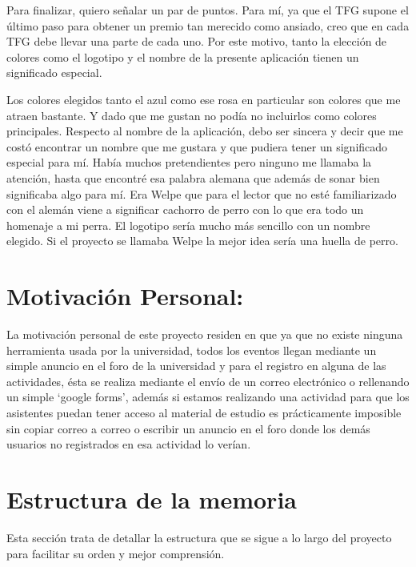Para finalizar, quiero señalar un par de puntos. Para mí, ya que el TFG supone el último paso para obtener un premio tan merecido como ansiado, creo que en cada TFG debe llevar una parte de cada uno. Por este motivo, tanto la elección de colores como el logotipo y el nombre de la presente aplicación tienen un significado especial. 


Los colores elegidos tanto el azul como ese rosa en particular son colores que me atraen bastante. Y dado que me gustan no podía no incluirlos como colores principales.
Respecto al nombre de la aplicación, debo ser sincera y decir que me costó encontrar un nombre que me gustara y que pudiera tener un significado especial para mí. Había muchos pretendientes pero ninguno me llamaba la atención, hasta que encontré esa palabra alemana que además de sonar bien significaba algo para mí. Era Welpe que para el lector que no esté familiarizado con el alemán viene a significar cachorro de perro con lo que era todo un homenaje a mi perra. El logotipo sería mucho más sencillo con un nombre elegido. Si el proyecto se llamaba Welpe la mejor idea sería una huella de perro.



\section{Motivación Personal:}
La motivación personal de este proyecto residen en que ya que no existe ninguna herramienta usada por la universidad, todos los eventos llegan mediante un simple anuncio en el foro de la universidad y para el registro en alguna de las actividades, ésta  se realiza mediante el envío de un correo electrónico o rellenando un simple ‘google forms’, además si estamos realizando una actividad para que los asistentes puedan tener acceso al material de estudio es prácticamente imposible sin copiar correo a correo o escribir un anuncio en el foro donde los demás usuarios no registrados en esa actividad lo verían. 


\section{Estructura de la memoria}
Esta sección trata de detallar la estructura que se sigue a lo largo del proyecto para facilitar su orden y mejor comprensión.


